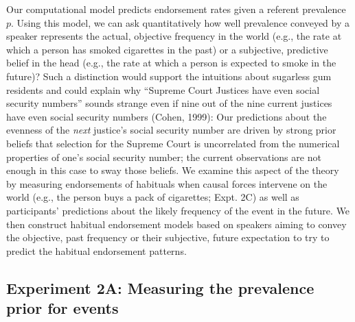 \documentclass[english,,man,floatsintext]{apa6}
\theoremstyle{definition}
\theoremstyle{definition}
\theoremstyle{definition}
\theoremstyle{remark}
\begin{document}
Our computational model predicts endorsement rates given a referent
prevalence \(p\). Using this model, we can ask quantitatively how well
prevalence conveyed by a speaker represents the actual, objective
frequency in the world (e.g., the rate at which a person has smoked
cigarettes in the past) or a subjective, predictive belief in the head
(e.g., the rate at which a person is expected to smoke in the future)?
Such a distinction would support the intuitions about sugarless gum
residents and could explain why \enquote{Supreme Court Justices have
even social security numbers} sounds strange even if nine out of the
nine current justices have even social security numbers (Cohen, 1999):
Our predictions about the evenness of the \emph{next} justice's social
security number are driven by strong prior beliefs that selection for
the Supreme Court is uncorrelated from the numerical properties of one's
social security number; the current observations are not enough in this
case to sway those beliefs. We examine this aspect of the theory by
measuring endorsements of habituals when causal forces intervene on the
world (e.g., the person buys a pack of cigarettes; Expt. 2C) as well as
participants' predictions about the likely frequency of the event in the
future. We then construct habitual endorsement models based on speakers
aiming to convey the objective, past frequency or their subjective,
future expectation to try to predict the habitual endorsement patterns.

\hypertarget{experiment-2a-measuring-the-prevalence-prior-for-events}{%
\subsection{Experiment 2A: Measuring the prevalence prior for
events}\label{experiment-2a-measuring-the-prevalence-prior-for-events}}
\end{document}

